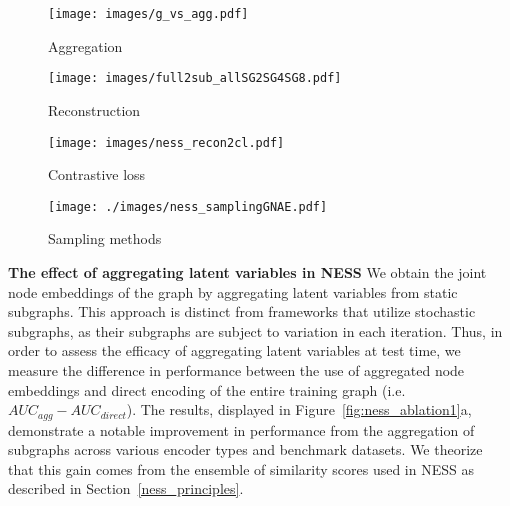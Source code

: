 \documentclass{article}
\begin{document}
\begin{figure*}[h]
\vskip 0.2in
\begin{center}
     \begin{subfigure}[c]{0.22\textwidth}
         \texttt{[image: images/g\_vs\_agg.pdf]}
         \caption{Aggregation}
     \end{subfigure}
     \begin{subfigure}[c]{0.22\textwidth}
         \texttt{[image: images/full2sub\_allSG2SG4SG8.pdf]}
         \caption{Reconstruction}
     \end{subfigure}
     \begin{subfigure}[c]{0.22\textwidth}
         \texttt{[image: images/ness\_recon2cl.pdf]}
         \caption{Contrastive loss}
     \end{subfigure}
     \begin{subfigure}[c]{0.31\textwidth}
         \texttt{[image: ./images/ness\_samplingGNAE.pdf]}
         \caption{Sampling methods}
     \end{subfigure}
\caption{Experiments with NESS: \textbf{a)} The difference in AUC scores (\%) obtained in two ways for NESS2: i) Aggregating the latent variables of static subgraphs i.e. $\bm Z=Agg(\bm z_1, \bm z_2)$, (our default case), ii) Getting the latent variable of the entire graph directly i.e. $\bm Z=E(\bm X, \bm A)$ at test time. The aggregation performs better across all models and datasets; The difference in AUC scores (\%) when: \textbf{b)} we reconstruct subgraphs rather than full graph. \textbf{c)} we use contrastive and reconstruction loss rather than only reconstruction loss. \textbf{d)} comparing NESS2 to other sampling strategies.}\label{fig:ness_ablation1}
\end{center}
\vskip -0.2in
\end{figure*}

\textbf{The effect of aggregating latent variables in NESS}
We obtain the joint node embeddings of the graph by aggregating latent variables from static subgraphs. This approach is distinct from frameworks that utilize stochastic subgraphs, as their subgraphs are subject to variation in each iteration. Thus, in order to assess the efficacy of aggregating latent variables at test time, we measure the difference in performance between the use of aggregated node embeddings and direct encoding of the entire training graph (i.e. $AUC_{agg}-AUC_{direct}$). The results, displayed in Figure~\ref{fig:ness_ablation1}a, demonstrate a notable improvement in performance from the aggregation of subgraphs across various encoder types and benchmark datasets. We theorize that this gain comes from the ensemble of similarity scores used in NESS as described in Section~\ref{ness_principles}.
\end{document}
